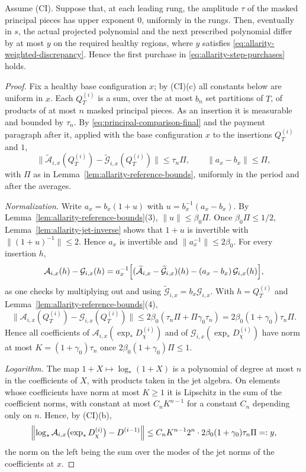 \begin{lemma}
\label{lem:allarity-step-discrepancy}
Assume (CI). Suppose that, at each leading rung, the amplitude $\tau$ of
the masked principal pieces has upper exponent $0$, uniformly in the
rungs. Then, eventually in $s$, the actual projected polynomial and the
next prescribed polynomial differ by at most $y$ on the required healthy
regions, where $y$ satisfies \eqref{eq:allarity-weighted-discrepancy}.
Hence the first purchase in \eqref{eq:allarity-step-purchases} holds.
\end{lemma}
\begin{proof}
Fix a healthy base configuration $x$; by (CI)(c) all constants below are
uniform in $x$. Each $Q^{(i)}_T$ is a sum, over the at most $b_n$ set
partitions of $T$, of products of at most $n$ masked principal pieces. As
an insertion it is measurable and bounded by $\tau_n$. By
\eqref{eq:principal-comparison-final} and the payment paragraph after it,
applied with the base configuration $x$ to the insertions $Q^{(i)}_T$ and
$1$,
\[
 \|\widetilde{\mathcal A}_{i,x}(Q^{(i)}_T)-\widetilde{\mathcal G}_{i,x}(Q^{(i)}_T)\|
  \le\tau_n\Pi,\qquad \|a_x-b_x\|\le\Pi,
\]
with $\Pi$ as in Lemma~\ref{lem:allarity-reference-bounds}, uniformly in
the period and after the averages.

\emph{Normalization.} Write $a_x=b_x(1+u)$ with $u=b_x^{-1}(a_x-b_x)$. By
Lemma~\ref{lem:allarity-reference-bounds}(3), $\|u\|\le\beta_0\Pi$. Once $\beta_0\Pi\le1/2$,
Lemma~\ref{lem:allarity-jet-inverse} shows that $1+u$ is invertible with
$\|(1+u)^{-1}\|\le2$. Hence $a_x$ is invertible and
$\|a_x^{-1}\|\le2\beta_0$. For every insertion $h$,
\[
 \mathcal A_{i,x}(h)-\mathcal G_{i,x}(h)
  =a_x^{-1}\Bigl[(\widetilde{\mathcal A}_{i,x}-\widetilde{\mathcal G}_{i,x})(h)
    -(a_x-b_x)\,\mathcal G_{i,x}(h)\Bigr],
\]
as one checks by multiplying out and using
$\widetilde{\mathcal G}_{i,x}=b_x\mathcal G_{i,x}$. With $h=Q^{(i)}_T$ and
Lemma~\ref{lem:allarity-reference-bounds}(4),
\[
 \|\mathcal A_{i,x}(Q^{(i)}_T)-\mathcal G_{i,x}(Q^{(i)}_T)\|
  \le2\beta_0(\tau_n\Pi+\Pi\gamma_0\tau_n)=2\beta_0(1+\gamma_0)\tau_n\Pi .
\]
Hence all coefficients of $\mathcal A_{i,x}(\exp_*D^{(i)}_\chi)$ and of
$\mathcal G_{i,x}(\exp_*D^{(i)}_\chi)$ have norm at most
$K=(1+\gamma_0)\tau_n$ once $2\beta_0(1+\gamma_0)\Pi\le1$.

\emph{Logarithm.} The map $1+X\mapsto\log_*(1+X)$ is a polynomial of
degree at most $n$ in the coefficients of $X$, with products taken in the
jet algebra. On elements whose coefficients have norm at most $K\ge1$ it
is Lipschitz in the sum of the coefficient norms, with constant at most
$C_nK^{n-1}$ for a constant $C_n$ depending only on $n$. Hence, by
(CI)(b),
\[
 \Bigl\|\log_*\mathcal A_{i,x}\bigl(\exp_*D^{(i)}_\chi\bigr)-D^{(i-1)}\Bigr\|
 \le C_nK^{n-1}2^n\cdot2\beta_0(1+\gamma_0)\tau_n\Pi=:y ,
\]
the norm on the left being the sum over the modes of the jet norms of
the coefficients at $x$.


\end{proof}

